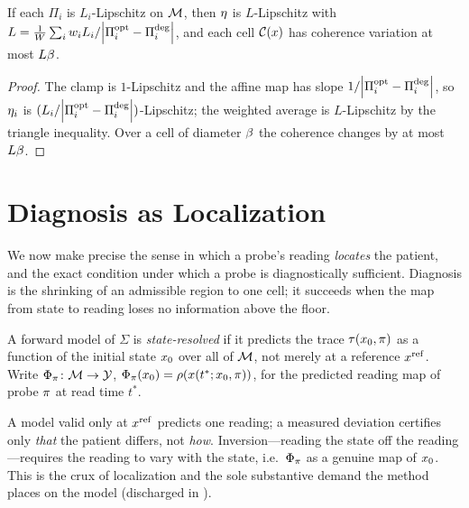 \begin{lemma}
\label{cfc:lem:coherence-lipschitz}
If each $\Pi_i$ is $L_i$-Lipschitz on $\mathcal{M}$, then $\eta$ is
$L$-Lipschitz with
$L=\tfrac1W\sum_i w_i L_i/\abs{\Pi_i^{\mathrm{opt}}-\Pi_i^{\mathrm{deg}}}$, and
each cell $\mathcal{C}(x)$ has coherence variation at most $L\beta$.
\end{lemma}

\begin{proof}
The clamp is $1$-Lipschitz and the affine map has slope
$1/\abs{\Pi_i^{\mathrm{opt}}-\Pi_i^{\mathrm{deg}}}$, so
$\eta_i$ is $(L_i/\abs{\Pi_i^{\mathrm{opt}}-\Pi_i^{\mathrm{deg}}})$-Lipschitz;
the weighted average is $L$-Lipschitz by the triangle inequality. Over a cell
of diameter $\beta$ the coherence changes by at most $L\beta$.
\end{proof}

\section{Diagnosis as Localization}
\label{cfc:sec:diagnosis}

We now make precise the sense in which a probe's reading \emph{locates} the
patient, and the exact condition under which a probe is diagnostically
sufficient. Diagnosis is the shrinking of an admissible region to one cell; it
succeeds when the map from state to reading loses no information above the
floor.

\begin{definition}
\label{cfc:def:stateresolved}
A forward model of $\Sigma$ is \emph{state-resolved} if it predicts the trace
$\tau(x_0,\pi)$ as a function of the initial state $x_0$ over all of
$\mathcal{M}$, not merely at a reference $x^{\mathrm{ref}}$. Write
$\Phi_\pi\colon\mathcal{M}\to\mathcal{Y}$,
$\Phi_\pi(x_0)=\rho(x(t^{\ast};x_0,\pi))$, for the predicted reading
map of probe $\pi$ at read time $t^{\ast}$.
\end{definition}

\begin{remark}
\label{cfc:rem:reference}
A model valid only at $x^{\mathrm{ref}}$ predicts one reading; a measured
deviation certifies only \emph{that} the patient differs, not \emph{how}.
Inversion---reading the state off the reading---requires the reading to vary
with the state, i.e.\ $\Phi_\pi$ as a genuine map of $x_0$. This is the
crux of localization and the sole substantive demand the method places on the
model (discharged in ).
\end{remark}

